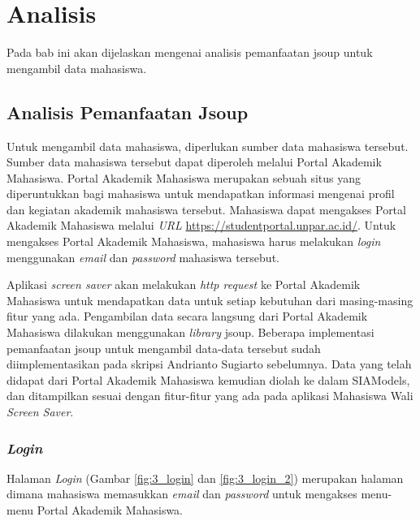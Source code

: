 \chapter{Analisis}
\label{chap:analisis}

Pada bab ini akan dijelaskan mengenai analisis pemanfaatan jsoup untuk mengambil data mahasiswa.

\section{Analisis Pemanfaatan Jsoup}
Untuk mengambil data mahasiswa, diperlukan sumber data mahasiswa tersebut. Sumber data mahasiswa tersebut dapat diperoleh melalui Portal Akademik Mahasiswa. Portal Akademik Mahasiswa merupakan sebuah situs yang diperuntukkan bagi mahasiswa untuk mendapatkan informasi mengenai profil dan kegiatan akademik mahasiswa tersebut. Mahasiswa dapat mengakses Portal Akademik Mahasiswa melalui \textit{URL} \url{https://studentportal.unpar.ac.id/}. Untuk mengakses Portal Akademik Mahasiswa, mahasiswa harus melakukan \textit{login} menggunakan \textit{email} dan \textit{password} mahasiswa tersebut.

Aplikasi \textit{screen saver} akan melakukan \textit{http request} ke Portal Akademik Mahasiswa untuk mendapatkan data untuk setiap kebutuhan dari masing-masing fitur yang ada. Pengambilan data secara langsung dari Portal Akademik Mahasiswa dilakukan menggunakan \textit{library} jsoup. Beberapa implementasi pemanfaatan jsoup untuk mengambil data-data tersebut sudah diimplementasikan pada skripsi Andrianto Sugiarto \cite{ifstupor} sebelumnya. Data yang telah didapat dari Portal Akademik Mahasiswa kemudian diolah ke dalam SIAModels, dan ditampilkan sesuai dengan fitur-fitur yang ada pada aplikasi Mahasiswa Wali \textit{Screen Saver}.

\subsection{\textit{Login}}
Halaman \textit{Login} (Gambar \ref{fig:3_login} dan \ref{fig:3_login_2}) merupakan halaman dimana mahasiswa memasukkan \textit{email} dan \textit{password} untuk mengakses menu-menu Portal Akademik Mahasiswa.

